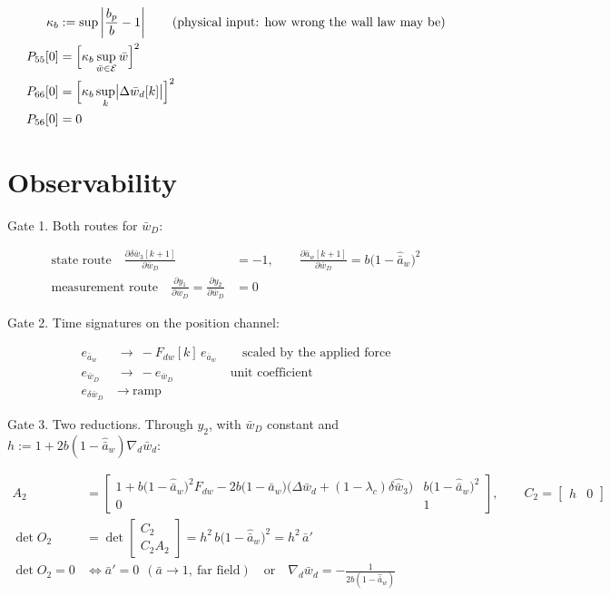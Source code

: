 \documentclass[11pt,a4paper,fontset=none]{ctexart}
\newcommand{\ba}{\bar{a}}
\newcommand{\bw}{\bar{w}}
\newcommand{\bwD}{\bar{w}_D}
\begin{document}
\begin{align*}
\kappa_b &:= \sup\left|\frac{b_p}{b}-1\right|
  \qquad \text{(physical input: how wrong the wall law may be)} \\
P_{55}[0] &= \Bigl[\kappa_b \sup_{\bw\in\mathcal{E}} \bw\Bigr]^{2} \\
P_{66}[0] &= \Bigl[\kappa_b \sup_k \bigl|\Delta\bw_d[k]\bigr|\Bigr]^{2} \\
P_{56}[0] &= 0
\end{align*}

\section*{Observability}

Gate 1. Both routes for $\bwD$:

\begin{align*}
\text{state route} \quad
  \frac{\partial \delta\bw_3[k+1]}{\partial \bwD} &= -1 ,
  \qquad
  \frac{\partial \ba_w[k+1]}{\partial \bwD} = b\bigl(1-\hat{\ba}_w\bigr)^{2} \\
\text{measurement route} \quad
  \frac{\partial y_1}{\partial \bwD} = \frac{\partial y_2}{\partial \bwD} &= 0
\end{align*}

Gate 2. Time signatures on the position channel:

\begin{align*}
e_{\ba_w} &\ \longrightarrow\ -F_{dw}[k]\,e_{\ba_w}
  \qquad \text{scaled by the applied force} \\
e_{\bwD}  &\ \longrightarrow\ -e_{\bwD}
  \qquad\qquad\ \ \text{unit coefficient} \\
e_{\delta\bwD} &\ \longrightarrow\ \text{ramp}
\end{align*}

Gate 3. Two reductions. Through $y_2$, with $\bwD$ constant and
$h := 1 + 2b(1-\hat{\ba}_w)\nabla_d\bw_d$:

\begin{align*}
A_2 &= \begin{bmatrix}
  1 + b\bigl(1-\hat{\ba}_w\bigr)^{2}F_{dw}
    - 2b\bigl(1-\hat{\ba}_w\bigr)
      \bigl(\Delta\bw_d + (1-\lambda_c)\delta\hat{\bw}_3\bigr)
  & b\bigl(1-\hat{\ba}_w\bigr)^{2} \\[0.4em]
  0 & 1
\end{bmatrix} ,
\qquad
C_2 = \begin{bmatrix} h & 0 \end{bmatrix} \\[0.6em]
\det O_2 &= \det\begin{bmatrix} C_2 \\ C_2 A_2 \end{bmatrix}
  = h^{2}\,b\bigl(1-\hat{\ba}_w\bigr)^{2} = h^{2}\,\ba' \\[0.4em]
\det O_2 = 0 &\iff \ba' = 0 \ \ (\ba \to 1, \ \text{far field})
  \quad\text{or}\quad \nabla_d\bw_d = -\frac{1}{2b(1-\hat{\ba}_w)}
\end{align*}
\end{document}
